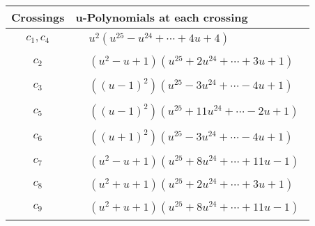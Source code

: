 \documentclass[1p]{elsarticle_modified}
\theoremstyle{definition}
\begin{document}
\begin{tabular}{m{50pt}|m{274pt}}
Crossings & \hspace{64pt}u-Polynomials at each crossing \\
\hline $$\begin{aligned}c_{1},c_{4}\end{aligned}$$&$\begin{aligned}
&u^2(u^{25}- u^{24}+\cdots+4 u+4)
\end{aligned}$\\
\hline $$\begin{aligned}c_{2}\end{aligned}$$&$\begin{aligned}
&(u^2- u+1)(u^{25}+2 u^{24}+\cdots+3 u+1)
\end{aligned}$\\
\hline $$\begin{aligned}c_{3}\end{aligned}$$&$\begin{aligned}
&((u-1)^2)(u^{25}-3 u^{24}+\cdots-4 u+1)
\end{aligned}$\\
\hline $$\begin{aligned}c_{5}\end{aligned}$$&$\begin{aligned}
&((u-1)^2)(u^{25}+11 u^{24}+\cdots-2 u+1)
\end{aligned}$\\
\hline $$\begin{aligned}c_{6}\end{aligned}$$&$\begin{aligned}
&((u+1)^2)(u^{25}-3 u^{24}+\cdots-4 u+1)
\end{aligned}$\\
\hline $$\begin{aligned}c_{7}\end{aligned}$$&$\begin{aligned}
&(u^2- u+1)(u^{25}+8 u^{24}+\cdots+11 u-1)
\end{aligned}$\\
\hline $$\begin{aligned}c_{8}\end{aligned}$$&$\begin{aligned}
&(u^2+u+1)(u^{25}+2 u^{24}+\cdots+3 u+1)
\end{aligned}$\\
\hline $$\begin{aligned}c_{9}\end{aligned}$$&$\begin{aligned}
&(u^2+u+1)(u^{25}+8 u^{24}+\cdots+11 u-1)
\end{aligned}$\\
\hline
\end{tabular}\newpage\renewcommand{\arraystretch}{1}
\end{document}
